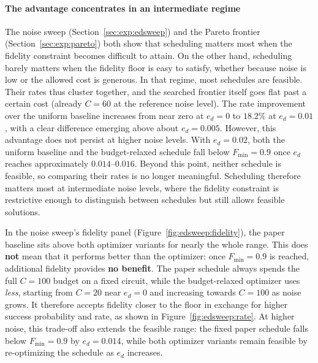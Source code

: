 \paragraph{The advantage concentrates in an intermediate regime}
\label{sec:disc:nearoptimal}
The noise sweep (Section~\ref{sec:exp:edsweep}) and the Pareto frontier (Section~\ref{sec:exp:pareto}) both show that scheduling matters most when the fidelity constraint becomes difficult to attain. On the other hand, scheduling barely matters when the fidelity floor is easy to satisfy, whether because noise is low or the allowed cost is generous. In that regime, most schedules are feasible. Their rates thus cluster together, and the searched frontier itself goes flat past a certain cost (already $C=60$ at the reference noise level). The rate improvement over the uniform baseline increases from near zero at $e_d=0$ to $18.2\%$ at $e_d=0.01$, with a clear difference emerging above about $e_d=0.005$. However, this advantage does not persist at higher noise levels. With $e_d=0.02$, both the uniform baseline and the budget-relaxed schedule fall below $F_{\min}=0.9$ once $e_d$ reaches approximately $0.014$--$0.016$. Beyond this point, neither schedule is feasible, so comparing their rates is no longer meaningful. Scheduling therefore matters most at intermediate noise levels, where the fidelity constraint is restrictive enough to distinguish between schedules but still allows feasible solutions.

In the noise sweep's fidelity panel (Figure~\ref{fig:edsweep:fidelity}), the paper baseline sits above both optimizer variants for nearly the whole range. This does \textbf{not} mean that it performs better than the optimizer: once $F_{\min}=0.9$ is reached, additional fidelity provides \textbf{no benefit}. The paper schedule always spends the full $C=100$ budget on a fixed circuit, while the budget-relaxed optimizer uses \emph{less}, starting from $C=20$ near $e_d=0$ and increasing towards $C=100$ as noise grows. It therefore accepts fidelity closer to the floor in exchange for higher success probability and rate, as shown in Figure~\ref{fig:edsweep:rate}. At higher noise, this trade-off also extends the feasible range: the fixed paper schedule falls below $F_{\min}=0.9$ by $e_d=0.014$, while both optimizer variants remain feasible by re-optimizing the schedule as $e_d$ increases.

